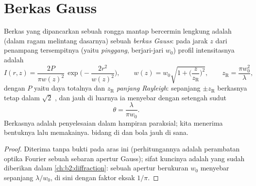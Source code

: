 \section{Berkas Gauss}

\begin{proposition}\label{prop:b2:laser:gaussian}
Berkas yang dipancarkan sebuah rongga mantap bercermin lengkung adalah (dalam
ragam melintang dasarnya) sebuah \emph{berkas Gauss}: pada jarak $z$ dari penampang tersempitnya (yaitu
\emph{pinggang}, berjari-jari $w_0$) profil
intensitasnya adalah
\[
I(r,z) = \frac{2P}{\pi w(z)^2}\,\exp\Big(-\frac{2r^2}{w(z)^2}\Big),
\qquad
w(z) = w_0\sqrt{1 + \Big(\frac{z}{z_{\text{R}}}\Big)^2},
\qquad
z_{\text{R}} = \frac{\pi w_0^2}{\lambda},
\]
dengan $P$ yaitu daya totalnya dan $z_{\text{R}}$ \emph{panjang
Rayleigh}: sepanjang $\pm z_{\text{R}}$ berkasnya tetap
dalam $\sqrt2$ , dan jauh di luarnya ia menyebar dengan
setengah sudut
\[
\theta = \frac{\lambda}{\pi w_0} .
\]
Berkasnya adalah penyelesaian  dalam hampiran
paraksial; kita menerima bentuknya lalu memakainya.  bidang di
 dan bola jauh di sana.
\end{proposition}

\begin{proof}
Diterima tanpa bukti pada aras ini (perhitungannya adalah perambatan optika
Fourier sebuah sebaran apertur Gauss); sifat kuncinya adalah
yang sudah diberikan  dalam \cref{ch:b2:diffraction}: sebuah
apertur berukuran $w_0$ menyebar sepanjang $\lambda/w_0$, di sini dengan faktor
eksak $1/\pi$.
\end{proof}


